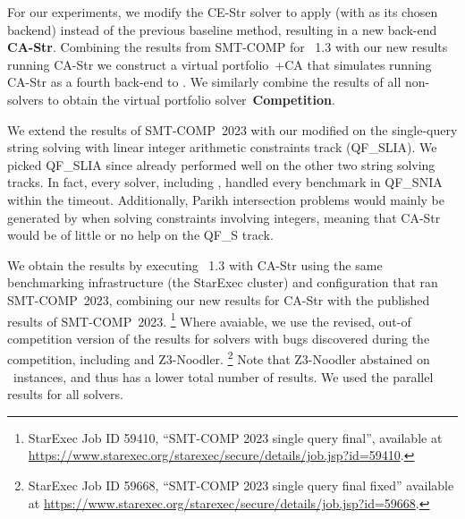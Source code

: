 For our experiments, we modify the CE-Str solver to apply \Catra{}
 (with \Calculus{} as its chosen backend)
instead of the previous baseline method, resulting in a new back-end
\textbf{CA-Str}. Combining the results from SMT-COMP for \Ostrich{}~1.3 
with our new results running CA-Str we construct a virtual 
portfolio~\Ostrich{}+CA that simulates running CA-Str as a fourth
back-end to \Ostrich{}. We similarly combine the results of all non-\Ostrich{} solvers
to obtain the virtual portfolio solver~\textbf{Competition}.

%
%

We extend the results of SMT-COMP~2023 with our modified \Ostrich{}
on the single-query string solving with linear integer arithmetic constraints
track (QF\_SLIA). We picked QF\_SLIA since
\Ostrich{} already performed well on the other two string solving tracks. In fact,
every solver, including \Ostrich{}, handled every benchmark in QF\_SNIA within the timeout.
Additionally, Parikh intersection problems would mainly be generated by \Ostrich{} when
solving constraints involving integers, meaning that CA-Str would be of little or no
help on the QF\_S track.

We obtain the results by executing \Ostrich{}~1.3 with CA-Str using
the same benchmarking infrastructure (the StarExec cluster)
and configuration that ran SMT-COMP~2023, combining our new results for CA-Str with the
published results of SMT-COMP~2023.
\footnote{StarExec Job ID 59410, \enquote{SMT-COMP 2023 single query final}, 
available at \url{https://www.starexec.org/starexec/secure/details/job.jsp?id=59410}.} 
Where avaiable, we use the revised, out-of
competition version of the results for solvers with bugs discovered during
the competition, including \Ostrich{} and Z3-Noodler. 
\footnote{StarExec Job ID 59668, \enquote{SMT-COMP 2023 single query final fixed} available at
\url{https://www.starexec.org/starexec/secure/details/job.jsp?id=59668}.}
Note that Z3-Noodler abstained on ~instances, and thus has a lower total number of results.
We used the parallel results for all solvers.

